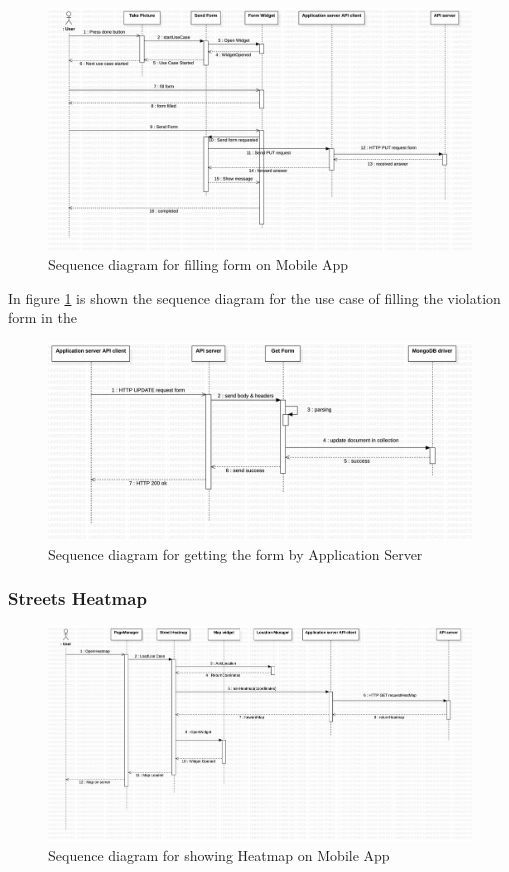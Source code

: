 \begin{figure}[H]
\centering
\includegraphics[width=\textwidth]{Images/DDSeqAppForm.png}
\caption{\label{fig:DDSeqAppForm} Sequence diagram for filling form on Mobile App}
\end{figure}
In figure \ref{fig:DDSeqAppForm} is shown the sequence diagram for the use case of filling the violation form in the




\begin{figure}[H]
\centering
\includegraphics[width=\textwidth]{Images/DDSeqSeverForm.png}
\caption{\label{fig:DDSeqSeverForm} Sequence diagram for getting the form by Application Server}
\end{figure}


\subsubsection{Streets Heatmap}%
\begin{figure}[H]
\centering
\includegraphics[width=\textwidth]{Images/DDSeqAppMap.png}
\caption{\label{fig:DDSeqAppMap} Sequence diagram for showing Heatmap on Mobile App}
\end{figure}

